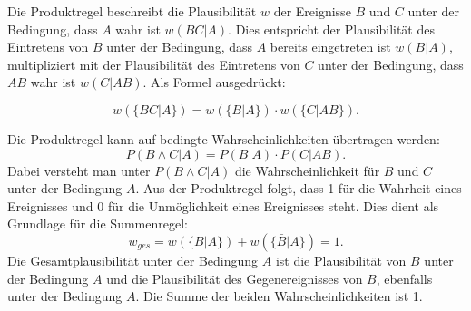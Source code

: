 Die Produktregel beschreibt die Plausibilität $w$ der Ereignisse $B$ und $C$ unter der Bedingung, dass $A$ wahr ist $w(BC|A)$. Dies entspricht der Plausibilität des Eintretens von $B$ unter der Bedingung, dass $A$ bereits eingetreten ist $w(B|A)$, 
multipliziert mit der Plausibilität des Eintretens von $C$ unter der Bedingung, dass $AB$ wahr ist $w(C|AB)$. Als Formel ausgedrückt:

\begin{equation}
    w(\{BC|A\})=w(\{B|A\})\cdot w(\{C|AB\}) .
\end{equation}



\noindent Die Produktregel kann auf bedingte Wahrscheinlichkeiten übertragen werden:
\begin {equation}
P(B \wedge C|A) = P(B|A)\cdot P(C|AB).
\end{equation}
Dabei versteht man unter $P(B \wedge C|A)$ die Wahrscheinlichkeit für $B$ und $C$ unter der Bedingung $A$.
Aus der Produktregel folgt, dass 1 für die Wahrheit eines Ereignisses und 0 für die Unmöglichkeit eines Ereignisses steht. Dies dient als Grundlage für die Summenregel:
\begin{equation}
    w_{ges}=w(\{B|A\}) + w(\{\bar{B}|A\})= 1 .
\end{equation}
Die Gesamtplausibilität unter der Bedingung $A$ ist die Plausibilität von $B$ unter der Bedingung $A$ 
und die Plausibilität des Gegenereignisses von $B$, ebenfalls unter der Bedingung $A$. Die Summe der beiden Wahrscheinlichkeiten ist 1.
